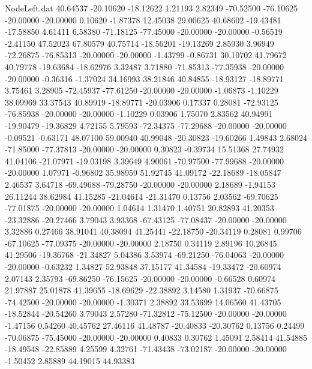 \begin{filecontents}{NodeLeft.dat}
  40.64537  -20.10620  -18.12622     1.21193    2.82349  -70.52500  -76.10625  -20.00000  -20.00000    0.10620   -1.87378   12.45038   29.00625
  40.68602  -19.43481  -17.58850     4.61411    6.58380  -71.18125  -77.45000  -20.00000  -20.00000   -0.56519   -2.41150   47.52023   67.80579
  40.75714  -18.56201  -19.13269     2.85930    3.96949  -72.26875  -76.85313  -20.00000  -20.00000   -1.43799   -0.86731   30.10702   41.79672
  40.79778  -19.63684  -18.62976     3.32487    3.71880  -71.85313  -77.35938  -20.00000  -20.00000   -0.36316   -1.37024   34.16993   38.21846
  40.84855  -18.93127  -18.89771     3.75461    3.28905  -72.45937  -77.61250  -20.00000  -20.00000   -1.06873   -1.10229   38.09969   33.37543
  40.89919  -18.89771  -20.03906     0.17337    0.28081  -72.93125  -76.85938  -20.00000  -20.00000   -1.10229    0.03906    1.75070    2.83562
  40.94991  -19.90479  -19.36829     4.72155    5.79593  -72.34375  -77.29688  -20.00000  -20.00000   -0.09521   -0.63171   48.07100   59.00940
  40.99048  -20.30823  -19.60266     1.49843    2.68024  -71.85000  -77.37813  -20.00000  -20.00000    0.30823   -0.39734   15.51368   27.74932
  41.04106  -21.07971  -19.03198     3.39649    4.90061  -70.97500  -77.99688  -20.00000  -20.00000    1.07971   -0.96802   35.98959   51.92745
  41.09172  -22.18689  -18.05847     2.46537    3.64718  -69.49688  -79.28750  -20.00000  -20.00000    2.18689   -1.94153   26.11244   38.62984
  41.15285  -21.04614  -21.31470     0.13756    2.03562  -69.70625  -77.01875  -20.00000  -20.00000    1.04614    1.31470    1.40751   20.82893
  41.20353  -23.32886  -20.27466     3.79043    3.93368  -67.43125  -77.08437  -20.00000  -20.00000    3.32886    0.27466   38.91041   40.38094
  41.25441  -22.18750  -20.34119     0.28081    0.99706  -67.10625  -77.09375  -20.00000  -20.00000    2.18750    0.34119    2.89196   10.26845
  41.29506  -19.36768  -21.34827     5.04386    3.53974  -69.21250  -76.04063  -20.00000  -20.00000   -0.63232    1.34827   52.93848   37.15177
  41.34584  -19.33472  -20.60974     2.07143    2.35793  -69.86250  -76.15625  -20.00000  -20.00000   -0.66528    0.60974   21.97887   25.01878
  41.39655  -18.69629  -22.38892     3.14580    1.31937  -70.66875  -74.42500  -20.00000  -20.00000   -1.30371    2.38892   33.53699   14.06560
  41.43705  -18.52844  -20.54260     3.79043    2.57280  -71.32812  -75.12500  -20.00000  -20.00000   -1.47156    0.54260   40.45762   27.46116
  41.48787  -20.40833  -20.30762     0.13756    0.24499  -70.06875  -75.45000  -20.00000  -20.00000    0.40833    0.30762    1.45091    2.58414
  41.54885  -18.49548  -22.85889     4.25599    4.32761  -71.43438  -73.02187  -20.00000  -20.00000   -1.50452    2.85889   44.19015   44.93383

\end{filecontents}
